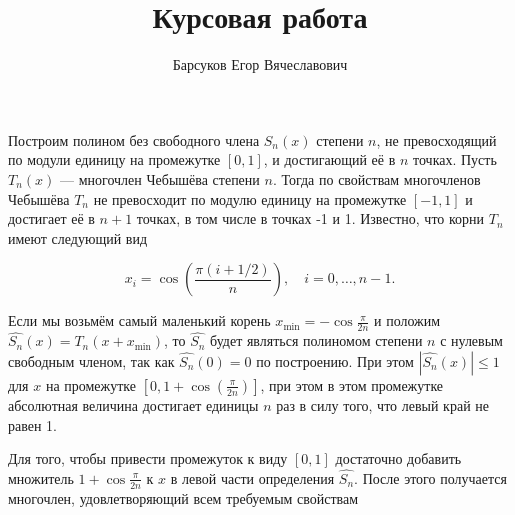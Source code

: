 \documentclass[specialist,
               substylefile = spbu.rtx,
               subf,href,colorlinks=true, 12pt]{disser}
\theoremstyle{definition}
\newcommand\abs[1]{\left\lvert#1\right\rvert}
\begin{document}

\title{Курсовая работа}


\author{Барсуков Егор Вячеславович}



\date{\number\year}




	Построим полином без свободного члена $S_n(x)$ степени $n$, не превосходящий по модули единицу на промежутке $[0, 1]$, и достигающий её в $n$ точках. Пусть $T_n(x)$ --- многочлен Чебышёва степени $n$. Тогда по свойствам многочленов Чебышёва $T_n$ не превосходит по модулю единицу на промежутке $[-1, 1]$ и достигает её в $n+1$ точках, в том числе в точках -1 и 1. Известно, что корни $T_n$ имеют следующий вид
	
	\begin{equation*}
		x_{i}=\cos \left({\frac {\pi (i+1/2)}{n}}\right),\quad i=0,\ldots ,n-1.
	\end{equation*}	 
	
	Если мы возьмём самый маленький корень $x_{\text{min}} = - \cos \frac{\pi}{2n}$ и положим $\widehat{S_n}(x) = T_n(x + x_{\text{min}})$, то $\widehat{S_n}$ будет являться полиномом степени $n$ с нулевым свободным членом, так как $\widehat{S_n}(0) = 0$ по построению. При этом $\abs{\widehat{S_n}(x)} \leqslant 1$ для $x$ на промежутке $[0, 1+ \cos \left(\frac{\pi}{2n}\right)]$, при этом в этом промежутке абсолютная величина достигает единицы $n$ раз в силу того, что левый край не равен 1.
	
	Для того, чтобы привести промежуток к виду $[0, 1]$ достаточно добавить множитель $1 + \cos \frac{\pi}{2n}$  к $x$ в левой части определения $\widehat{S_n}$. После этого получается многочлен, удовлетворяющий всем требуемым свойствам
	
\end{document}

